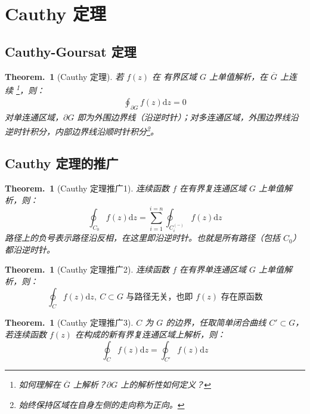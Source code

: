 \documentclass[UTF8]{report}
\theoremstyle{MyLineTheoremStyle} %
\theoremstyle{MyBlockTheoremStyle} %
\newtheorem{BlockTheorem}[LineTheorem]{Theorem.\,} %
\theoremstyle{MySubsubsectionStyle} %
\begin{document}
\section{Cauthy 定理}

\subsection{Cauthy-Goursat 定理}

\begin{BlockTheorem}[Cauthy 定理]\label{Cauthy 定理}
若 $f(z)$ 在{\color{red} 有界}区域 $G$ 上单值解析，在 $\overline{G}$ 上连续 \footnote{如何理解在 $\overline{G}$ 上解析？$\partial G$ 上的解析性如何定义？}，则：
\begin{gather}
\oint_{\partial G} f(z) \mathrm{d}z = 0
\end{gather}
对单连通区域，$\partial G$ 即为外围边界线（沿逆时针）；对多连通区域，外围边界线沿逆时针积分，内部边界线沿顺时针积分\footnote{始终保持区域在自身左侧的走向称为正向。}。
\end{BlockTheorem}

\subsection{Cauthy 定理的推广}

\begin{BlockTheorem}[Cauthy 定理推广1]\label{Cauthy 定理推广1}
连续函数 $f$ 在有界复连通区域 $G$ 上单值解析，则：
\begin{equation}
\oint_{C_0} f(z) \mathrm{d}z = \sum_{i=1}^{i=n} \oint_{C_i^{(-)}} f(z) \mathrm{d}z
\end{equation}
路径上的负号表示路径沿反相，在这里即沿逆时针。也就是所有路径（包括 $C_0$）都沿逆时针。
\end{BlockTheorem}

\begin{BlockTheorem}[Cauthy 定理推广2]\label{Cauthy 定理推广2}
    连续函数 $f$ 在有界单连通区域 $G$ 上单值解析，则：
    \begin{equation}
    \text{$\oint_C f(z)\mathrm{d}z,\ C \subset G$ 与路径无关，也即 $f(z)$ 存在原函数}
    \end{equation}
\end{BlockTheorem}

\begin{BlockTheorem}[Cauthy 定理推广3]\label{Cauthy 定理推广3}
    $C$ 为 $G$ 的边界，任取简单闭合曲线 $C' \subset G$，若连续函数 $f(z)$ 在构成的新有界复连通区域上解析，则：
    \begin{equation}
        \oint_{C} f(z) \mathrm{d}z = \oint_{C'} f(z) \mathrm{d}z
    \end{equation}
\end{BlockTheorem}
\end{document}

